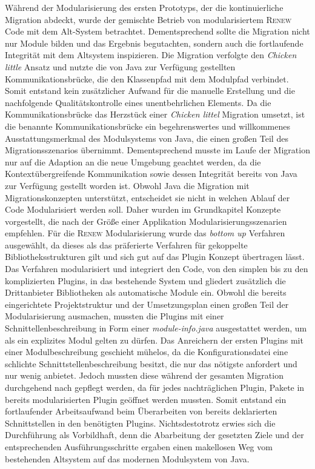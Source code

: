 Während der Modularisierung des ersten Prototyps, der die kontinuierliche Migration abdeckt, wurde der gemischte Betrieb von modularisiertem \textsc{Renew} Code mit dem Alt-System betrachtet. Dementsprechend sollte die Migration nicht nur Module bilden und das Ergebnis begutachten, sondern auch die fortlaufende Integrität mit dem Altsystem inspizieren.\newline
Die Migration verfolgte den \textit{Chicken little} Ansatz und nutzte die von Java zur Verfügung gestellten Kommunikationsbrücke, die den Klassenpfad mit dem Modulpfad verbindet. Somit entstand kein zusätzlicher Aufwand für die manuelle Erstellung und die nachfolgende Qualitätskontrolle eines unentbehrlichen Elements. Da die Kommunikationsbrücke das Herzstück einer \textit{Chicken littel} Migration umsetzt, ist die benannte Kommunikationsbrücke ein begehrenswertes und willkommenes Ausstattungsmerkmal des Modulsystems von Java, die einen großen Teil des Migrationsszenarios übernimmt. Dementsprechend musste im Laufe der Migration nur auf die Adaption an die neue Umgebung geachtet werden, da die Kontextübergreifende Kommunikation sowie dessen Integrität bereits von Java zur Verfügung gestellt worden ist. \newline
Obwohl Java die Migration mit Migrationskonzepten unterstützt, entscheidet sie nicht in welchen Ablauf der Code Modularisiert werden soll. Daher wurden im Grundkapitel Konzepte vorgestellt, die nach der Größe einer Applikation Modularisierungsszenarien empfehlen. Für die \textsc{Renew} Modularisierung wurde das \textit{bottom up} Verfahren ausgewählt, da dieses als das präferierte Verfahren für gekoppelte Bibliotheksstrukturen gilt und sich gut auf das Plugin Konzept übertragen lässt. Das Verfahren modularisiert und integriert den Code, von den simplen bis zu den komplizierten Plugins, in das bestehende System und gliedert zusätzlich die Drittanbieter Bibliotheken als automatische Module ein.\newline 
Obwohl die bereits eingerichtete Projektstruktur und der Umsetzungsplan einen großen Teil der Modularisierung ausmachen, mussten die Plugins mit einer Schnittellenbeschreibung in Form einer \textit{module-info.java} ausgestattet werden, um als ein explizites Modul gelten zu dürfen. Das Anreichern der ersten Plugins mit einer Modulbeschreibung geschieht mühelos, da die Konfigurationsdatei eine schlichte Schnittstellenbeschreibung besitzt, die nur das nötigste anfordert und nur wenig anbietet. Jedoch mussten diese während der gesamten Migration durchgehend nach gepflegt werden, da für jedes nachträglichen Plugin, Pakete in bereits modularisierten Plugin geöffnet werden mussten. Somit entstand ein fortlaufender Arbeitsaufwand beim Überarbeiten von bereits deklarierten Schnittstellen in den benötigten Plugins.\newline
Nichtsdestotrotz erwies sich die Durchführung als Vorbildhaft, denn die Abarbeitung der gesetzten Ziele und der entsprechenden Ausführungsschritte ergaben einen makellosen Weg vom bestehenden Altsystem auf das modernen Modulsystem von Java.\bigbreak

